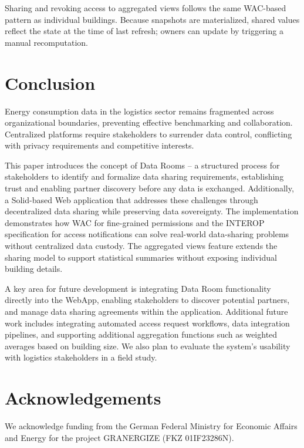 \documentclass[
]{ceurart}
\begin{document}
Sharing and revoking access to aggregated views follows the same WAC-based pattern as individual buildings.
Because snapshots are materialized, shared values reflect the state at the time of last refresh; owners can update by triggering a manual recomputation.

\section{Conclusion}

Energy consumption data in the logistics sector remains fragmented across organizational boundaries, preventing effective benchmarking and collaboration.
Centralized platforms require stakeholders to surrender data control, conflicting with privacy requirements and competitive interests.

This paper introduces the concept of Data Rooms -- a structured process for stakeholders to identify and formalize data sharing requirements, establishing trust and enabling partner discovery before any data is exchanged. Additionally, a Solid-based Web application that addresses these challenges through decentralized data sharing while preserving data sovereignty.
The implementation demonstrates how WAC for fine-grained permissions and the INTEROP specification for access notifications can solve real-world data-sharing problems without centralized data custody.
The aggregated views feature extends the sharing model to support statistical summaries without exposing individual building details.

A key area for future development is integrating Data Room functionality directly into the WebApp, enabling stakeholders to discover potential partners, and manage data sharing agreements within the application.
Additional future work includes integrating automated access request workflows, data integration pipelines, and supporting additional aggregation functions such as weighted averages based on building size.
We also plan to evaluate the system's usability with logistics stakeholders in a field study.


\section{Acknowledgements}
We acknowledge funding from the German Federal Ministry for Economic Affairs and Energy for the project GRANERGIZE (FKZ 01IF23286N).


\end{document}
